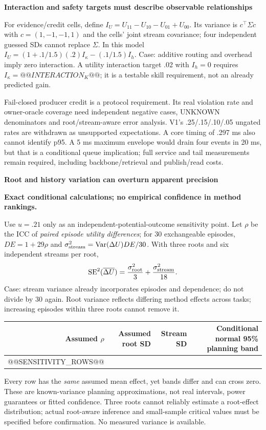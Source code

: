\documentclass[10pt,a4paper]{article}
\newcommand{\lead}[1]{\vspace{3pt}\textbf{#1}\par}
\newcommand{\status}{\textcolor{red!70!black}{\textbf{Exact conditional calculations; no empirical confidence in method rankings.}}\par}
\begin{document}
\lead{Interaction and safety targets must describe observable relationships}
For evidence/credit cells, define $I_U=U_{11}-U_{10}-U_{01}+U_{00}$.
Its variance is $c^\top\Sigma c$ with $c=(1,-1,-1,1)$ and the cells' joint
stream covariance; four independent guessed SDs cannot replace $\Sigma$.
In this model $I_U=(1+.1/1.5)(.2)I_\kappa-(.1/1.5)I_h$.
Case: additive routing and overhead imply zero interaction. A utility interaction
target .02 with $I_h=0$ requires $I_\kappa=@@INTERACTION_K@@$;
it is a testable skill requirement, not an already predicted gain.

Fail-closed producer credit is a protocol requirement. Its real violation rate
and owner-oracle coverage need independent negative cases, UNKNOWN denominators
and root/stream-aware error analysis. V1's .25/.15/.10/.05 ungated rates are
withdrawn as unsupported expectations. A core timing of .297 ms also cannot
identify p95. A 5 ms maximum envelope would drain four events in 20 ms, but that
is a conditional queue implication; full service and tail measurements remain
required, including backbone/retrieval and publish/read costs.

\clearpage
\lead{Root and history variation can overturn apparent precision}\status
Use $u=.21$ only as an independent-potential-outcome sensitivity point.
Let $\rho$ be the ICC of \emph{paired episode utility differences}; for 30
exchangeable episodes, $DE=1+29\rho$ and
$\sigma_{\rm stream}^2=\operatorname{Var}(\Delta U)DE/30$.
With three roots and six independent streams per root,
\[
 \operatorname{SE}^2(\overline{\Delta U})=
 \frac{\sigma_{\rm root}^2}{3}+\frac{\sigma_{\rm stream}^2}{18}.
\]
Case: stream variance already incorporates episodes and dependence; do not
divide by 30 again. Root variance reflects differing method effects across
tasks; increasing episodes within three roots cannot remove it.
\begin{center}\small
\begin{tabular*}{\linewidth}{@{\extracolsep{\fill}}rrrr@{}}\toprule
Assumed $\rho$ & Assumed root SD & Stream SD & Conditional normal 95\% planning band\\\midrule
@@SENSITIVITY_ROWS@@
\bottomrule\end{tabular*}\end{center}
Every row has the \emph{same} assumed mean effect, yet bands differ and can cross
zero. These are known-variance planning approximations, not real intervals,
power guarantees or fitted confidence. Three roots cannot reliably estimate a
root-effect distribution; actual root-aware inference and small-sample critical
values must be specified before confirmation. No measured variance is available.
\end{document}
